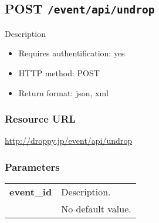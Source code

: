 \documentclass[11pt,a4paper]{article}
\newcommand{\content}[1]{\begin{minipage}{10cm}\vspace{2mm}#1\vspace{2mm}\end{minipage}}
\begin{document}
      \newpage
      
      
  \subsection*{POST {\tt /event/api/undrop}}
  Description
  \begin{itemize}
  \item Requires authentification: yes
  \item HTTP method: POST
  \item Return format: json, xml
  \end{itemize}
  \subsubsection*{Resource URL}
  \url{http://droppy.jp/event/api/undrop}
  \subsubsection*{Parameters}
  \begin{table}[h]
    \begin{center}
      \begin{tabular}{l l}
        \hline 
      \textbf{event\_id} & \content{Description. }
      \\
       & No default value.\\
      \hline
      \end{tabular}
    \end{center}
  \end{table}
  
      \newpage
      
\end{document}
